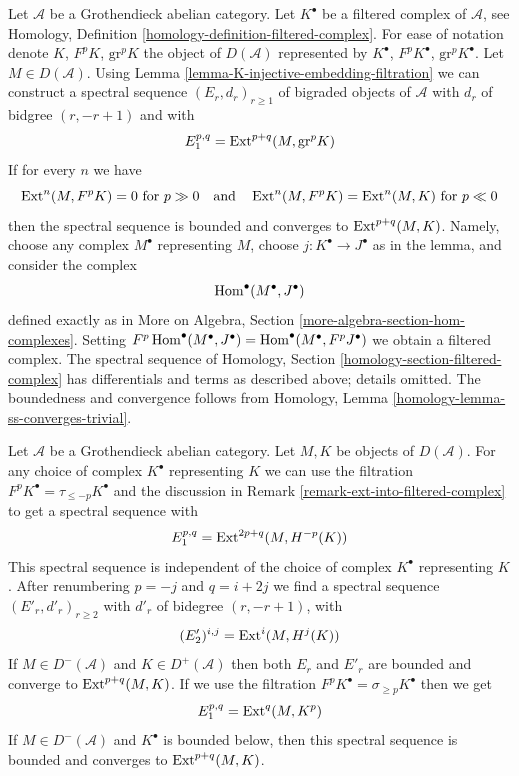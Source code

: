 \begin{remark}
\label{remark-ext-into-filtered-complex}
Let $\mathcal{A}$ be a Grothendieck abelian category.
Let $K^\bullet$ be a filtered complex of $\mathcal{A}$, see
Homology, Definition \ref{homology-definition-filtered-complex}.
For ease of notation denote $K$, $F^pK$, $\text{gr}^pK$ the
object of $D(\mathcal{A})$ represented by $K^\bullet$,
$F^pK^\bullet$, $\text{gr}^pK^\bullet$. Let $M \in D(\mathcal{A})$.
Using Lemma \ref{lemma-K-injective-embedding-filtration}
we can construct a spectral sequence $(E_r, d_r)_{r \geq 1}$
of bigraded objects of $\mathcal{A}$ with $d_r$ of bidgree
$(r, -r + 1)$ and
with
$$
E_1^{p, q} = \mathop{\mathrm{Ext}}\nolimits^{p + q}(M, \text{gr}^pK)
$$
If for every $n$ we have
$$
\mathop{\mathrm{Ext}}\nolimits^n(M, F^pK) = 0 \text{ for } p \gg 0
\quad\text{and}\quad
\mathop{\mathrm{Ext}}\nolimits^n(M, F^pK) = \mathop{\mathrm{Ext}}\nolimits^n(M, K) \text{ for } p \ll 0
$$
then the spectral sequence is bounded and converges to $\mathop{\mathrm{Ext}}\nolimits^{p + q}(M, K)$.
Namely, choose any complex $M^\bullet$ representing $M$, choose
$j : K^\bullet \to J^\bullet$ as in the lemma, and consider the complex
$$
\mathop{\mathrm{Hom}}\nolimits^\bullet(M^\bullet, J^\bullet)
$$
defined exactly as in
More on Algebra, Section \ref{more-algebra-section-hom-complexes}.
Setting $F^p\mathop{\mathrm{Hom}}\nolimits^\bullet(M^\bullet, J^\bullet) =
\mathop{\mathrm{Hom}}\nolimits^\bullet(M^\bullet, F^pJ^\bullet)$ we obtain a filtered complex.
The spectral sequence of
Homology, Section \ref{homology-section-filtered-complex}
has differentials and terms as described above; details omitted.
The boundedness and convergence follows from
Homology, Lemma \ref{homology-lemma-ss-converges-trivial}.
\end{remark}

\begin{remark}
\label{remark-spectral-sequences-ext}
Let $\mathcal{A}$ be a Grothendieck abelian category.
Let $M, K$ be objects of $D(\mathcal{A})$.
For any choice of complex $K^\bullet$ representing $K$ we
can use the filtration $F^pK^\bullet = \tau_{\leq -p}K^\bullet$
and the discussion in Remark \ref{remark-ext-into-filtered-complex}
to get a spectral sequence with
$$
E_1^{p, q} = \mathop{\mathrm{Ext}}\nolimits^{2p + q}(M, H^{-p}(K))
$$
This spectral sequence is independent of the choice of
complex $K^\bullet$ representing $K$. After renumbering
$p = -j$ and $q = i + 2j$ we find a spectral sequence
$(E'_r, d'_r)_{r \geq 2}$ with $d'_r$ of bidegree $(r, -r + 1)$, with
$$
(E'_2)^{i, j} = \mathop{\mathrm{Ext}}\nolimits^i(M, H^j(K))
$$
If $M \in D^-(\mathcal{A})$ and $K \in D^+(\mathcal{A})$ then
both $E_r$ and $E'_r$ are bounded and converge to $\mathop{\mathrm{Ext}}\nolimits^{p + q}(M, K)$.
If we use the filtration $F^pK^\bullet = \sigma_{\geq p}K^\bullet$
then we get
$$
E_1^{p, q} = \mathop{\mathrm{Ext}}\nolimits^q(M, K^p)
$$
If $M \in D^-(\mathcal{A})$ and $K^\bullet$ is bounded below, then
this spectral sequence is bounded and converges to $\mathop{\mathrm{Ext}}\nolimits^{p + q}(M, K)$.
\end{remark}


